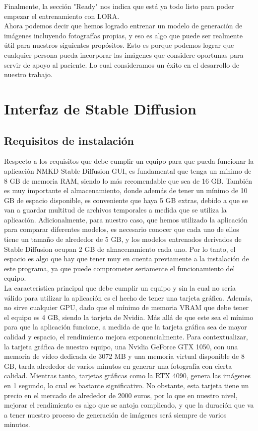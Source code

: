 Finalmente, la sección "Ready" nos indica que está ya todo listo para poder empezar el entrenamiento con LORA. \\

Ahora podemos decir que hemos logrado entrenar un modelo de generación de imágenes incluyendo fotografías propias, y eso es algo que puede ser realmente útil para nuestros siguientes propósitos. Esto es porque podemos lograr que cualquier persona pueda incorporar las imágenes que considere oportunas para servir de apoyo al paciente. Lo cual consideramos un éxito en el desarrollo de nuestro trabajo. 


\section{Interfaz de Stable Diffusion}

\subsection{Requisitos de instalación}

Respecto a los requisitos que debe cumplir un equipo para que pueda funcionar la aplicación NMKD Stable Diffusion GUI, es fundamental que tenga un mínimo de 8 GB de memoria RAM, siendo lo más recomendable que sea de 16 GB. También es muy importante el almacenamiento, donde además de tener un mínimo de 10 GB de espacio disponible, es conveniente que haya 5 GB extras, debido a que se van a guardar multitud de archivos temporales a medida que se utiliza la aplicación. Adicionalmente, para nuestro caso, que hemos utilizado la aplicación para comparar diferentes modelos, es necesario conocer que cada uno de ellos tiene un tamaño de alrededor de 5 GB, y los modelos entrenados derivados de Stable Diffusion ocupan 2 GB de almacenamiento cada uno. Por lo tanto, el espacio es algo que hay que tener muy en cuenta previamente a la instalación de este programa, ya que puede comprometer seriamente el funcionamiento del equipo. \\

La característica principal que debe cumplir un equipo y sin la cual no sería válido para utilizar la aplicación es el hecho de tener una tarjeta gráfica. Además, no sirve cualquier GPU, dado que el mínimo de memoria VRAM que debe tener el equipo es 4 GB, siendo la tarjeta de Nvidia. Más allá de que este sea el mínimo para que la aplicación funcione, a medida de que la tarjeta gráfica sea de mayor calidad y espacio, el rendimiento mejora exponencialmente. Para contextualizar, la tarjeta gráfica de nuestro equipo, una Nvidia GeForce GTX 1050, con una memoria de vídeo dedicada de 3072 MB y una memoria virtual disponible de 8 GB, tarda alrededor de varios minutos en generar una fotografía con cierta calidad. Mientras tanto, tarjetas gráficas como la RTX 4090, genera las imágenes en 1 segundo, lo cual es bastante significativo. No obstante, esta tarjeta tiene un precio en el mercado de alrededor de 2000 euros, por lo que en nuestro nivel, mejorar el rendimiento es algo que se antoja complicado, y que la duración que va a tener nuestro proceso de generación de imágenes será siempre de varios minutos.\\


